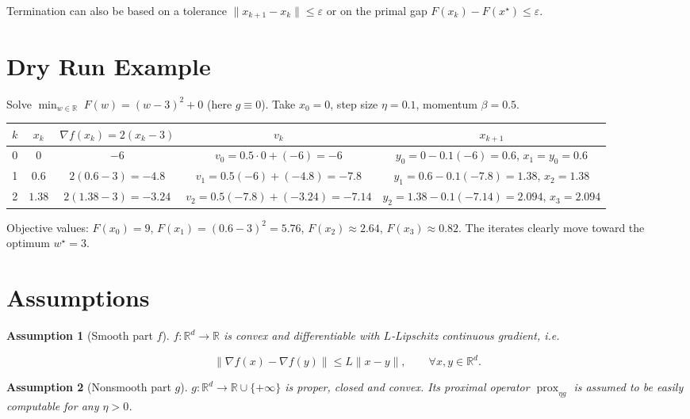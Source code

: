 \documentclass{article}
\newtheorem{assumption}{Assumption}
\newcommand{\prox}{\operatorname{prox}}
\newcommand{\grad}{\nabla}
\newcommand{\R}{\mathbb{R}}
\begin{document}
Termination can also be based on a tolerance $\|x_{k+1}-x_{k}\|\le\varepsilon$ or on the primal gap $F(x_{k})-F(x^{\star})\le\varepsilon$.

\section*{Dry Run Example}
Solve $\displaystyle\min_{w\in\R} \;F(w)= (w-3)^{2}+0$ (here $g\equiv0$).  
Take $x_{0}=0$, step size $\eta=0.1$, momentum $\beta=0.5$.

\begin{center}
\begin{tabular}{c c c c c}
\toprule
$k$ & $x_{k}$ & $\grad f(x_{k})=2(x_{k}-3)$ & $v_{k}$ & $x_{k+1}$ \\
\midrule
0 & $0$   & $-6$ & $v_{0}=0.5\cdot0+(-6)=-6$ & $y_{0}=0-0.1(-6)=0.6$, $x_{1}=y_{0}=0.6$ \\
1 & $0.6$ & $2(0.6-3)=-4.8$ & $v_{1}=0.5(-6)+(-4.8)=-7.8$ &
   $y_{1}=0.6-0.1(-7.8)=1.38$, $x_{2}=1.38$ \\
2 & $1.38$ & $2(1.38-3)=-3.24$ &
   $v_{2}=0.5(-7.8)+(-3.24)=-7.14$ &
   $y_{2}=1.38-0.1(-7.14)=2.094$, $x_{3}=2.094$ \\
\bottomrule
\end{tabular}
\end{center}

Objective values: $F(x_{0})=9$, $F(x_{1})=(0.6-3)^{2}=5.76$, $F(x_{2})\approx2.64$, $F(x_{3})\approx0.82$.  
The iterates clearly move toward the optimum $w^{\star}=3$.

\section*{Assumptions}
\begin{assumption}[Smooth part $f$]\label{ass:f}
$f:\R^{d}\to\R$ is convex and differentiable with $L$‑Lipschitz continuous gradient, i.e.  

\[
\|\grad f(x)-\grad f(y)\|\le L\|x-y\|,\qquad\forall x,y\in\R^{d}.
\tag{A1}
\]
\end{assumption}

\begin{assumption}[Nonsmooth part $g$]\label{ass:g}
$g:\R^{d}\to\R\cup\{+\infty\}$ is proper, closed and convex.  
Its proximal operator $\prox_{\eta g}$ is assumed to be easily computable for any $\eta>0$.
\end{assumption}
\end{document}
